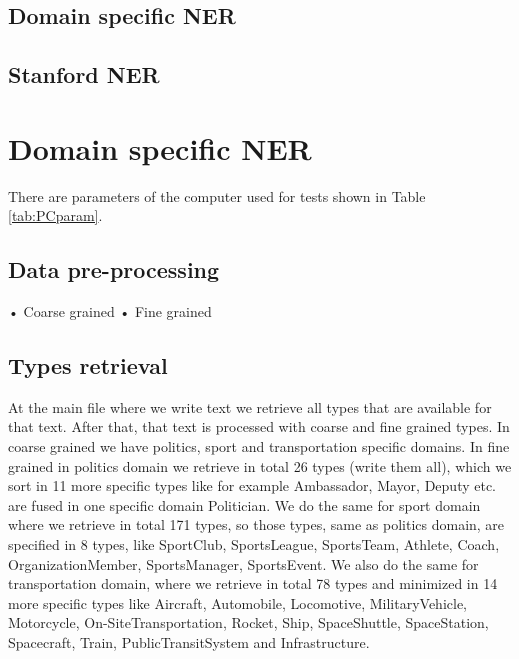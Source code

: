 \documentclass[thesis=M,english]{FITthesis}[2018/05/30]
\begin{document}
\section{Domain specific NER}

\section{Stanford NER}

\chapter{Domain specific NER}\label{}

There are parameters of the computer used for tests shown in Table \ref{tab:PCparam}.

\section{Data pre-processing}
•	Coarse grained
•	Fine grained 

\section{Types retrieval}\label{}
At the main file where we write text we retrieve all types that are available for that text. After that, that text is processed with coarse and fine grained types. In coarse grained we have politics, sport and transportation specific domains. In fine grained in politics domain we retrieve in total 26 types (write them all), which we sort in 11 more specific types like for example Ambassador, Mayor, Deputy etc. are fused in one specific domain Politician. We do the same for sport domain where we retrieve in total 171 types, so those types, same as politics domain, are specified in 8 types, like SportClub, SportsLeague, SportsTeam, Athlete, Coach, OrganizationMember, SportsManager, SportsEvent. We also do the same for transportation domain, where we retrieve in total 78 types and minimized in 14 more specific types like Aircraft, Automobile, Locomotive, MilitaryVehicle, Motorcycle, On-SiteTransportation, Rocket, Ship, SpaceShuttle, SpaceStation, Spacecraft, Train, PublicTransitSystem and Infrastructure.  
\end{document}
